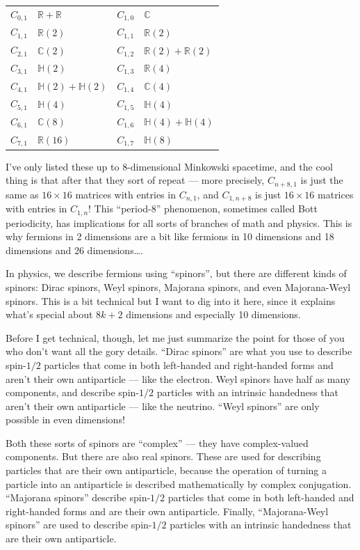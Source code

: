 \documentclass{article}
\begin{document}
\begin{longtable}[]{@{}rlrl@{}}
\toprule
\endhead
\(C_{0,1}\) & \(\mathbb{R}+\mathbb{R}\) & \(C_{1,0}\) &
\(\mathbb{C}\)\tabularnewline
\(C_{1,1}\) & \(\mathbb{R}(2)\) & \(C_{1,1}\) &
\(\mathbb{R}(2)\)\tabularnewline
\(C_{2,1}\) & \(\mathbb{C}(2)\) & \(C_{1,2}\) &
\(\mathbb{R}(2)+\mathbb{R}(2)\)\tabularnewline
\(C_{3,1}\) & \(\mathbb{H}(2)\) & \(C_{1,3}\) &
\(\mathbb{R}(4)\)\tabularnewline
\(C_{4,1}\) & \(\mathbb{H}(2)+\mathbb{H}(2)\) & \(C_{1,4}\) &
\(\mathbb{C}(4)\)\tabularnewline
\(C_{5,1}\) & \(\mathbb{H}(4)\) & \(C_{1,5}\) &
\(\mathbb{H}(4)\)\tabularnewline
\(C_{6,1}\) & \(\mathbb{C}(8)\) & \(C_{1,6}\) &
\(\mathbb{H}(4)+\mathbb{H}(4)\)\tabularnewline
\(C_{7,1}\) & \(\mathbb{R}(16)\) & \(C_{1,7}\) &
\(\mathbb{H}(8)\)\tabularnewline
\bottomrule
\end{longtable}

I've only listed these up to 8-dimensional Minkowski spacetime, and the
cool thing is that after that they sort of repeat --- more precisely,
\(C_{n+8,1}\) is just the same as \(16\times16\) matrices with entries
in \(C_{n,1}\), and \(C_{1,n+8}\) is just \(16\times16\) matrices with
entries in \(C_{1,n}\)! This ``period-8'' phenomenon, sometimes called
Bott periodicity, has implications for all sorts of branches of math and
physics. This is why fermions in 2 dimensions are a bit like fermions in
10 dimensions and 18 dimensions and 26 dimensions\ldots.

In physics, we describe fermions using ``spinors'', but there are
different kinds of spinors: Dirac spinors, Weyl spinors, Majorana
spinors, and even Majorana-Weyl spinors. This is a bit technical but I
want to dig into it here, since it explains what's special about
\(8k + 2\) dimensions and especially 10 dimensions.

Before I get technical, though, let me just summarize the point for
those of you who don't want all the gory details. ``Dirac spinors'' are
what you use to describe spin-\(1/2\) particles that come in both
left-handed and right-handed forms and aren't their own antiparticle ---
like the electron. Weyl spinors have half as many components, and
describe spin-\(1/2\) particles with an intrinsic handedness that aren't
their own antiparticle --- like the neutrino. ``Weyl spinors'' are only
possible in even dimensions!

Both these sorts of spinors are ``complex'' --- they have complex-valued
components. But there are also real spinors. These are used for
describing particles that are their own antiparticle, because the
operation of turning a particle into an antiparticle is described
mathematically by complex conjugation. ``Majorana spinors'' describe
spin-\(1/2\) particles that come in both left-handed and right-handed
forms and are their own antiparticle. Finally, ``Majorana-Weyl spinors''
are used to describe spin-\(1/2\) particles with an intrinsic handedness
that are their own antiparticle.
\end{document}
